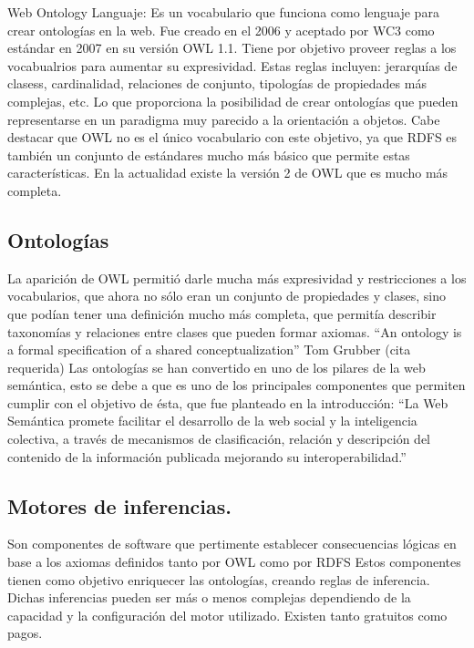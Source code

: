 Web Ontology Languaje: Es un vocabulario que funciona como lenguaje para crear ontologías en la web. Fue creado en el 2006 y aceptado 
por WC3 como estándar en 2007 en su versión OWL 1.1. Tiene por objetivo proveer reglas a los vocabualrios para aumentar su expresividad. 
Estas reglas incluyen: jerarquías de clasess, cardinalidad, relaciones de conjunto, tipologías de propiedades más complejas, etc. Lo que proporciona la posibilidad de crear ontologías que pueden 
representarse en un paradigma muy parecido a la orientación a objetos. Cabe destacar que OWL no es el único vocabulario con este objetivo, ya que RDFS 
es también un conjunto de estándares mucho más básico que permite estas características.
En la actualidad existe la versión 2 de OWL que es mucho más completa.

\subsection{Ontologías}

La aparición de OWL permitió darle mucha más expresividad y restricciones a los vocabularios, que ahora no sólo eran un conjunto de 
propiedades y clases, sino que podían tener una definición mucho más completa, que permitía describir taxonomías y relaciones entre clases que pueden formar axiomas.
``An ontology is a formal specification of a shared conceptualization'' Tom Grubber (cita requerida)
Las ontologías se han convertido en uno de los pilares de la web semántica, esto se debe a que es uno de los principales componentes que permiten 
cumplir con el objetivo de ésta, que fue planteado en la introducción: ``La Web Semántica promete facilitar el desarrollo de la web social y la inteligencia colectiva, a través de mecanismos de clasificación, relación y descripción del contenido de la información publicada mejorando su interoperabilidad.''

\subsection{Motores de inferencias.}

Son componentes de software que pertimente establecer consecuencias lógicas en base a los axiomas definidos tanto por OWL como por RDFS
Estos componentes tienen como objetivo enriquecer las ontologías, creando reglas de inferencia. 
Dichas inferencias pueden ser más o menos complejas dependiendo de la capacidad y la configuración del motor utilizado. Existen tanto gratuitos 
como pagos.


